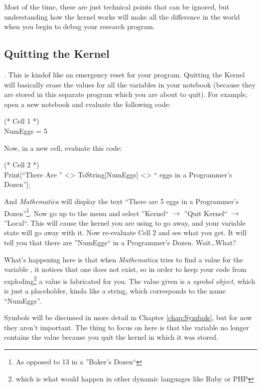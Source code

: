 Most of the time, these are just technical points that can be ignored, but understanding how the kernel works will make all the difference in the world when you begin to debug your research program.

\subsection{Quitting the Kernel}. This is kindof like an emergency reset for your program. Quitting the Kernel will basically erase the values for all the variables in your notebook (because they are stored in this separate program which you are about to quit). For example, open a new notebook and evaluate the following code:

\begin{code}
	   (* Cell 1 *)\\
	   NumEggs = 5
\end{code}

Now, in a new cell, evaluate this code:

\begin{code}
	(* Cell 2 *)\\
	Print[``There Are '' <> ToString[NumEggs] <> `` eggs in a Programmer's Dozen''];
\end{code}

And \emph{Mathematica} will display the text ``There are 5 eggs in a Programmer's Dozen''\footnote{As opposed to 13 in a ''Baker's Dozen``}. Now go up to the menu and select ''Kernel`` $\rightarrow$ ''Quit Kernel`` $\rightarrow$ ''Local``. This will cause the kernel you are using to go away, and your variable state will go away with it. Now re-evaluate Cell 2 and see what you get. It will tell you that there are ''NumEggs`` in a Programmer's Dozen. Wait\ldots What?

What's happening here is that when \emph{Mathematica} tries to find a value for the variable , it notices that one does not exist, so in order to keep your code from exploding\footnote{which is what would happen in other dynamic languages like Ruby or PHP} a value is fabricated for you. The value given is a \emph{symbol object}, which is just a placeholder, kinda like a string, which corresponds to the name ``NumEggs''.

Symbols will be discussed in more detail in Chapter \ref{chap:Symbols}, but for now they aren't important. The thing to focus on here is that the variable  no longer contains the value  because you quit the kernel in which it was stored.

